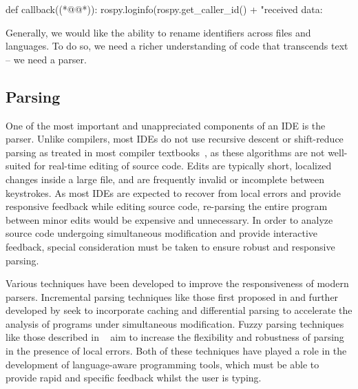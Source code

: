 \begin{pythonlisting}
def callback((*@@*)):
    rospy.loginfo(rospy.get_caller_id() + "received data: %
\end{pythonlisting}
%
Generally, we would like the ability to rename identifiers across files and languages. To do so, we need a richer understanding of code that transcends text -- we need a parser.

\subsection{Parsing}\label{subsec:the-parser}

One of the most important and unappreciated components of an IDE is the parser. Unlike compilers, most IDEs do not use recursive descent or shift-reduce parsing as treated in most compiler textbooks~\citep{appel2003modern}, as these algorithms are not well-suited for real-time editing of source code. Edits are typically short, localized changes inside a large file, and are frequently invalid or incomplete between keystrokes. As most IDEs are expected to recover from local errors and provide responsive feedback while editing source code, re-parsing the entire program between minor edits would be expensive and unnecessary. In order to analyze source code undergoing simultaneous modification and provide interactive feedback, special consideration must be taken to ensure robust and responsive parsing.

Various techniques have been developed to improve the responsiveness of modern parsers. Incremental parsing techniques like those first proposed in \citet{ghezzi1979incremental} and further developed by \citet{wagner1997practical,wagner1997incremental} seek to incorporate caching and differential parsing to accelerate the analysis of programs under simultaneous modification. Fuzzy parsing techniques like those described in ~\citet{koppler1997systematic} aim to increase the flexibility and robustness of parsing in the presence of local errors. Both of these techniques have played a role in the development of language-aware programming tools, which must be able to provide rapid and specific feedback whilst the user is typing.

